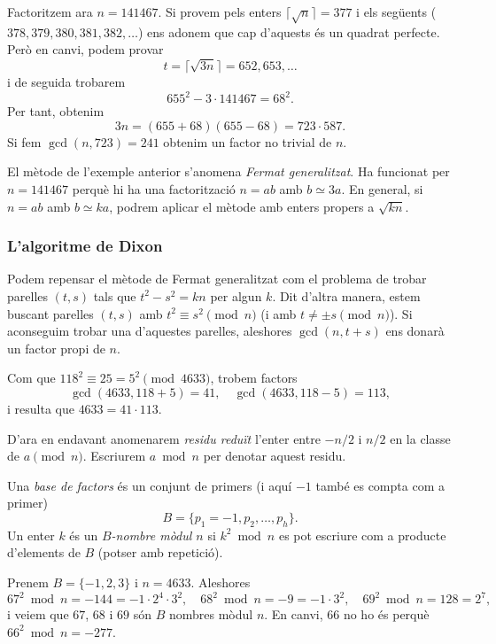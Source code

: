  \begin{example}
  Factoritzem ara $n=141467$. Si provem pels enters $\lceil\sqrt{n}\rceil = 377$ i els següents ($378, 379, 380, 381, 382,\ldots$) ens adonem que cap d'aquests és un quadrat perfecte. Però en canvi, podem provar
  \[
  t=\lceil\sqrt{3n}\rceil =652, 653,\ldots
  \]
  i de seguida trobarem
  \[
  655^2 - 3\cdot 141467 = 68^2.
  \]
  Per tant, obtenim
  \[
  3n = (655+68)(655-68)=723\cdot 587.
  \]
  Si fem $\gcd(n,723)=241$ obtenim un factor no trivial de $n$.
 \end{example}
 
 El mètode de l'exemple anterior s'anomena \emph{Fermat generalitzat}. Ha funcionat per $n=141467$ perquè hi ha una factorització $n=ab$ amb $b\simeq 3a$. En general, si $n=ab$ amb $b\simeq ka$, podrem aplicar el mètode amb enters propers a $\sqrt{kn}$.
 
 \subsubsection{L'algoritme de Dixon}
 Podem repensar el mètode de Fermat generalitzat com el problema de trobar parelles $(t,s)$ tals que $t^2-s^2=kn$ per algun $k$. Dit d'altra manera, estem buscant parelles $(t,s)$ amb $t^2\equiv s^2\pmod n$ (i amb $t\neq \pm s\pmod n$). Si aconseguim trobar una d'aquestes parelles, aleshores $\gcd(n,t+s)$ ens donarà un factor propi de $n$.
 
 \begin{example}
  Com que $118^2\equiv 25=5^2\pmod{4633}$, trobem factors
  \[
  \gcd(4633,118+5) = 41,\quad \gcd(4633,118-5) = 113,
  \]
  i resulta que $4633=41\cdot 113$.
 \end{example}
 
 D'ara en endavant anomenarem \emph{residu reduït} l'enter entre $-n/2$ i $n/2$ en la classe de $a\pmod{n}$. Escriurem $a\bmod n$ per denotar aquest residu.
 
 \begin{definition}
 Una \emph{base de factors} és un conjunt de primers (i aquí $-1$ també es compta com a primer)
 \[
 B=\{p_1=-1, p_2,\ldots, p_h\}.
 \]
 Un enter $k$ és un \emph{$B$-nombre mòdul $n$} si $k^2\bmod n$ es pot escriure com a producte d'elements de $B$ (potser amb repetició).
 \end{definition}
 
 \begin{example}
  Prenem $B=\{-1,2,3\}$ i $n=4633$. Aleshores
  \[
  67^2\bmod n = -144=-1\cdot 2^4\cdot 3^2,\quad 68^2\bmod n = -9=-1\cdot 3^2,\quad 69^2\bmod n = 128=2^7,
  \]
  i veiem que $67$, $68$ i $69$ són $B$ nombres mòdul $n$. En canvi, $66$ no ho és perquè $66^2\bmod n=-277$.
 \end{example}
 
